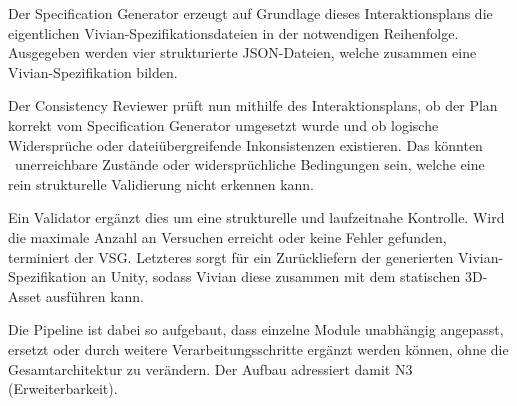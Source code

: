 Der Specification Generator erzeugt auf Grundlage dieses Interaktionsplans die eigentlichen Vivian-Spezifikationsdateien in der notwendigen Reihenfolge.
Ausgegeben werden vier strukturierte JSON-Dateien, welche zusammen eine Vivian-Spezifikation bilden.

Der Consistency Reviewer prüft nun mithilfe des Interaktionsplans, ob der Plan korrekt vom Specification Generator umgesetzt wurde und ob logische Widersprüche oder dateiübergreifende Inkonsistenzen existieren.
Das könnten \zB~unerreichbare Zustände oder widersprüchliche Bedingungen sein, welche eine rein strukturelle Validierung nicht erkennen kann.

Ein Validator ergänzt dies um eine strukturelle und laufzeitnahe Kontrolle.
Wird die maximale Anzahl an Versuchen erreicht oder keine Fehler gefunden, terminiert der VSG.
Letzteres sorgt für ein Zurückliefern der generierten Vivian-Spezifikation an Unity, sodass Vivian diese zusammen mit dem statischen 3D-Asset ausführen kann.

Die Pipeline ist dabei so aufgebaut, dass einzelne Module unabhängig angepasst, ersetzt oder durch weitere Verarbeitungsschritte ergänzt werden können, ohne die Gesamtarchitektur zu verändern. Der Aufbau adressiert damit N3 (Erweiterbarkeit).






